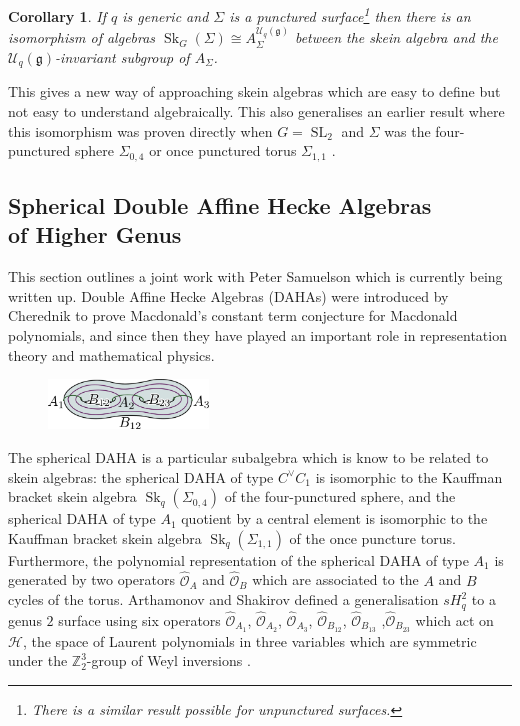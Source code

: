 \documentclass{article}
\newcommand{\Sk}{\operatorname{Sk}}
\newcommand{\SL}{\operatorname{SL}}
\newtheorem{cor}[thm]{Corollary}
\begin{document}
\begin{cor}\textup{\cite{C2}}
If $q$ is generic and $\Sigma$ is a punctured surface\footnote{There is a similar result possible for unpunctured surfaces.} then there is an isomorphism of algebras $\Sk_G(\Sigma) \cong A_{\Sigma}^{\mathcal{U}_q(\mathfrak{g})}$ between the skein algebra and the $\mathcal{U}_q(\mathfrak{g})$-invariant subgroup of $A_{\Sigma}$.  
\end{cor}

This gives a new way of approaching skein algebras which are easy to define but not easy to understand algebraically.
This also generalises an earlier result where this isomorphism was proven directly when $G=\SL_2$ and $\Sigma$ was the four-punctured sphere $\Sigma_{0,4}$ or once punctured torus $\Sigma_{1,1}$ \cite{C1}. 

\subsection{Spherical Double Affine Hecke Algebras \\ of Higher Genus}

This section outlines a joint work with Peter Samuelson which is currently being written up.
Double Affine Hecke Algebras (DAHAs) were introduced by Cherednik to prove Macdonald's constant term conjecture for Macdonald polynomials, and since then they have played an important role in representation theory and mathematical physics. 

\begin{figure}
  \begin{center}
    \includegraphics[width=0.38\textwidth]{2torus.pdf}
  \end{center}
\end{figure}
The spherical DAHA is a particular subalgebra which is know to be related to skein algebras: the spherical DAHA of type $C^{\vee}C_1$ is isomorphic to the Kauffman bracket skein algebra $\Sk_q(\Sigma_{0,4})$ of the four-punctured sphere, and the spherical DAHA of type $A_1$ quotient by a central element is isomorphic to the Kauffman bracket skein algebra $\Sk_q(\Sigma_{1,1})$ of the once puncture torus. Furthermore, the polynomial representation of the spherical DAHA of type $A_1$ is generated by two operators $\hat{\mathscr{O}}_A$ and $\hat{\mathscr{O}}_B$ which are associated to the $A$ and $B$ cycles of the torus. Arthamonov and Shakirov defined a generalisation $sH^{2}_q$ to a genus $2$ surface using six operators $\hat{\mathscr{O}}_{A_1}$, $\hat{\mathscr{O}}_{A_2}$, $\hat{\mathscr{O}}_{A_3}$, $\hat{\mathscr{O}}_{B_{12}}$, $\hat{\mathscr{O}}_{B_{13}}$ ,$\hat{\mathscr{O}}_{B_{23}}$ which act on $\mathscr{H}$, the space of Laurent polynomials in three variables which are symmetric under the $\mathbb{Z}^3_2$-group of Weyl inversions \cite{ArthamonovShakirov19}. 
\end{document}
